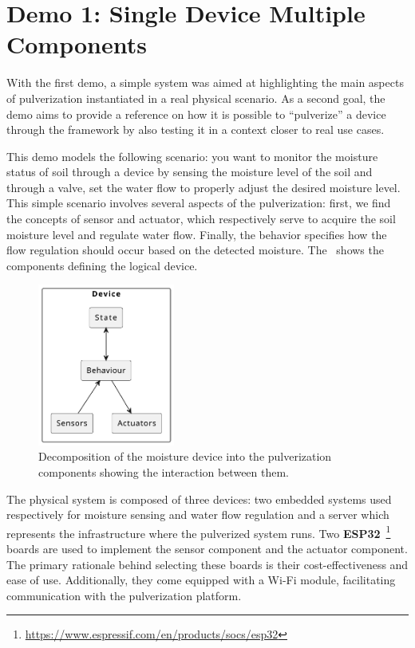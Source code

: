 \section{Demo 1: Single Device Multiple Components}
\label{sec:demo-1}

With the first demo, a simple system was aimed at highlighting the main aspects of pulverization instantiated in a real physical scenario.
As a second goal, the demo aims to provide a reference on how it is possible to ``pulverize'' a device through the framework by also testing it in a
context closer to real use cases.

This demo models the following scenario: you want to monitor the moisture status of soil through a device
by sensing the moisture level of the soil and through a valve, set the water flow to properly adjust the desired moisture level.
This simple scenario involves several aspects of the pulverization: first, we find the concepts of sensor and actuator, which respectively serve to
acquire the soil moisture level and regulate water flow. Finally, the behavior specifies how the flow regulation should occur based on
the detected moisture. The~ shows the components defining the logical device.

\begin{figure}
	\centering
	\includegraphics[width=0.4\textwidth]{figures/demo1-device.pdf}
	\caption{Decomposition of the moisture device into the pulverization components showing the interaction between them.}
	\label{fig:demo-1-system}
\end{figure}

The physical system is composed of three devices: two embedded systems used respectively for moisture sensing and water flow regulation and a server
which represents the infrastructure where the pulverized system runs.
Two \textbf{ESP32}~\footnote{\url{https://www.espressif.com/en/products/socs/esp32}} boards are used to implement the sensor component and the
actuator component. The primary rationale behind selecting these boards is their cost-effectiveness and ease of use. Additionally, they come equipped
with a Wi-Fi module, facilitating communication with the pulverization platform.


